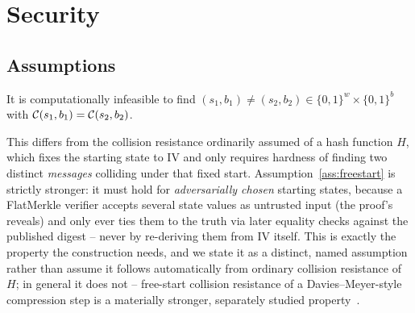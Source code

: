 \section{Security}
\label{sec:security}

\subsection{Assumptions}

\begin{assumption}
\label{ass:freestart}
It is computationally infeasible to find $(s_1, b_1) \ne (s_2, b_2) \in
\{0,1\}^w \times \{0,1\}^b$ with $\mathcal{C}(s_1,b_1) = \mathcal{C}(s_2,b_2)$.
\end{assumption}

This differs from the collision resistance ordinarily assumed of a hash
function $H$, which fixes the starting state to $\mathrm{IV}$ and only
requires hardness of finding two distinct \emph{messages} colliding under
that fixed start. Assumption~\ref{ass:freestart} is strictly stronger: it
must hold for \emph{adversarially chosen} starting states, because a
FlatMerkle verifier accepts several state values as untrusted input (the
proof's reveals) and only ever ties them to the truth via later equality
checks against the published digest -- never by re-deriving them from
$\mathrm{IV}$ itself. This is exactly the property the construction needs,
and we state it as a distinct, named assumption rather than assume it
follows automatically from ordinary collision resistance of $H$; in
general it does not -- free-start collision resistance of a
Davies--Meyer-style compression step is a materially stronger, separately
studied property~\citep{dobbertin1996}.

